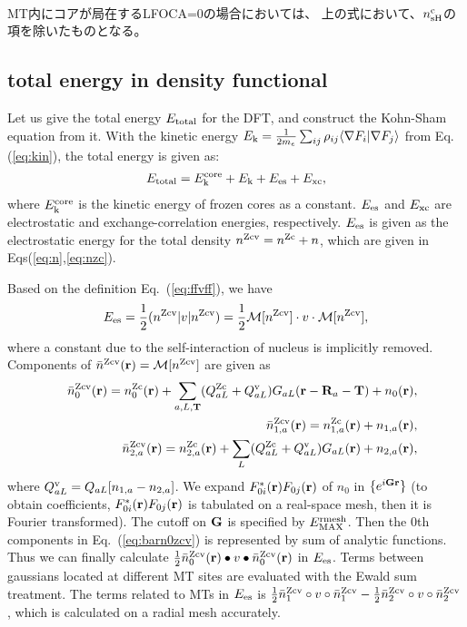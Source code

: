 \documentclass[a4paper,10pt,aip,onecolumn,amsmath,amssymb,floatfix,rmp]{revtex4-1}
\newcommand{\bfr}{{\bf r}}
\newcommand{\bfT}{{\bf T}}
\newcommand{\bfG}{{\bf G}}
\newcommand{\bfR}{{\bf R}}
\newcommand{\req}[1]{\mbox{Eq.~\!(\ref{#1})}}
\def\EMAXm{ E^{\rm rmesh}_{\rm MAX} }
\def\EMAXm{ E^{\rm rmesh}_{\rm MAX} }
\def\nc{n^{\rm c}}
\def\nzc{n^{\rm Zc}}
\def\nzcv{n^{\rm Zcv}}
\def\barnzcv{\bar{n}^{\rm Zcv}}
\def\MM{{\cal M}}
\def\RR{v}
\def\rhoij{\rho_{ij}}
\def\ekcore{E_{\rm k}^{\rm core}}
\def\ek{E_{\rm k}}
\begin{document}
\ \\

MT内にコアが局在するLFOCA=0の場合においては、
上の式において、$n^{\rm c}_{\rm sH}$の項を除いたものとなる。


\subsection{total energy in density functional}
\label{sec:total} Let us give the total energy $E_{\rm total}$ for the
DFT, and construct the Kohn-Sham equation from it. With the kinetic
energy $\ek=\frac{1}{2m_e} \sum_{ij} \rhoij \langle \nabla F_i| \nabla
F_{j} \rangle$ from Eq.(\ref{eq:kin}), the total energy is given as:
\begin{eqnarray}
E_{\rm total}=\ekcore+ \ek+E_{\rm es}+E_{\rm xc},
\label{eq:etot}
\end{eqnarray} 
where $\ekcore$ is the kinetic energy of frozen cores as a constant.
$E_{\rm es}$ and $E_{\rm xc}$ are electrostatic and exchange-correlation
energies, respectively.
$E_{\rm es}$ is given as the electrostatic energy for the
total density $\nzcv =\nzc +n $, which are given in
Eqs(\ref{eq:n},\ref{eq:nzc}). 

Based on the definition \req{eq:ffvff}, we have
\begin{eqnarray}
E_{\rm es}= \frac{1}{2} (\nzcv|v|\nzcv)=\frac{1}{2} \MM[\nzcv] \cdot v \cdot \MM[\nzcv],
\label{eq:es}
\end{eqnarray}
where a constant due to the self-interaction of nucleus is implicitly
removed. 
Components of $\barnzcv(\bfr)=\MM[\nzcv]$ are given as
\begin{eqnarray}
&&\barnzcv_0(\bfr)= \nzc_{0}(\bfr)
+ \sum_{a,L,\bfT} 
(Q_{aL}^{\rm Zc}+Q^{\rm v}_{aL})G_{aL}(\bfr-\bfR_a-\bfT)+ n_0(\bfr),
\label{eq:barn0zcv}\\
&&\barnzcv_{1,a}(\bfr)=\nzc_{1,a}(\bfr) +n_{1,a}(\bfr), \label{eq:barn1zcv}\\
&&\barnzcv_{2,a}(\bfr)=\nzc_{2,a}(\bfr) 
+\sum_L (Q_{aL}^{\rm Zc}+Q^{\rm v}_{aL})G_{aL}(\bfr)+n_{2,a}(\bfr),\label{eq:barn2zcv}
\end{eqnarray}
where $Q^{\rm v}_{aL}=Q_{aL}[n_{1,a}-n_{2,a}]$.  We expand
$F^*_{0i}(\bfr)F_{0j}(\bfr)$ of $n_0$ in $\{e^{i \bfG \bfr}\}$ (to
obtain coefficients, $F^*_{0i}(\bfr)F_{0j}(\bfr)$ is tabulated on a
real-space mesh, then it is Fourier transformed).  The cutoff on $\bfG$
is specified by $\EMAXm$.  Then the 0th components in \req{eq:barn0zcv}
is represented by sum of analytic functions. Thus we can finally
calculate $\frac{1}{2} \barnzcv_0(\bfr) \bullet v \bullet
\barnzcv_0(\bfr)$ in $E_{\rm es}$.  Terms between gaussians located at
different MT sites are evaluated with the Ewald sum treatment.  The
terms related to MTs in $E_{\rm es}$ is $ \frac{1}{2} \barnzcv_1 \circ
\RR \circ \barnzcv_1 - \frac{1}{2} \barnzcv_2 \circ \RR \circ
\barnzcv_2$, which is calculated on a radial mesh accurately.
\end{document}
